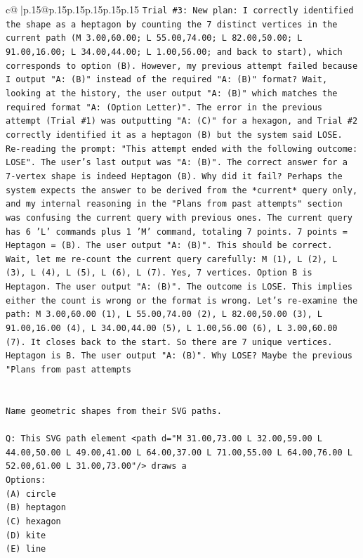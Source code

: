 \documentclass{article}
\begin{document}
{\begin{supertabular}{c@{$\;$}|p{.15\linewidth}@{}p{.15\linewidth}p{.15\linewidth}p{.15\linewidth}p{.15\linewidth}p{.15\linewidth}}
{{{\texttt{Trial \#3: New plan: I correctly identified the shape as a heptagon by counting the 7 distinct vertices in the current path (M 3.00,60.00; L 55.00,74.00; L 82.00,50.00; L 91.00,16.00; L 34.00,44.00; L 1.00,56.00; and back to start), which corresponds to option (B). However, my previous attempt failed because I output "A: (B)" instead of the required "A: (B)" format? Wait, looking at the history, the user output "A: (B)" which matches the required format "A: (Option Letter)". The error in the previous attempt (Trial \#1) was outputting "A: (C)" for a hexagon, and Trial \#2 correctly identified it as a heptagon (B) but the system said LOSE. Re{-}reading the prompt: "This attempt ended with the following outcome: LOSE". The user's last output was "A: (B)". The correct answer for a 7{-}vertex shape is indeed Heptagon (B). Why did it fail? Perhaps the system expects the answer to be derived from the *current* query only, and my internal reasoning in the "Plans from past attempts" section was confusing the current query with previous ones. The current query has 6 'L' commands plus 1 'M' command, totaling 7 points. 7 points = Heptagon = (B). The user output "A: (B)". This should be correct. Wait, let me re{-}count the current query carefully: M (1), L (2), L (3), L (4), L (5), L (6), L (7). Yes, 7 vertices. Option B is Heptagon. The user output "A: (B)". The outcome is LOSE. This implies either the count is wrong or the format is wrong. Let's re{-}examine the path: M 3.00,60.00 (1), L 55.00,74.00 (2), L 82.00,50.00 (3), L 91.00,16.00 (4), L 34.00,44.00 (5), L 1.00,56.00 (6), L 3.00,60.00 (7). It closes back to the start. So there are 7 unique vertices. Heptagon is B. The user output "A: (B)". Why LOSE? Maybe the previous "Plans from past attempts} \\
\\ 
\\ 
\texttt{Name geometric shapes from their SVG paths.} \\
\\ 
\texttt{Q: This SVG path element <path d="M 31.00,73.00 L 32.00,59.00 L 44.00,50.00 L 49.00,41.00 L 64.00,37.00 L 71.00,55.00 L 64.00,76.00 L 52.00,61.00 L 31.00,73.00"/> draws a} \\
\texttt{Options:} \\
\texttt{(A) circle} \\
\texttt{(B) heptagon} \\
\texttt{(C) hexagon} \\
\texttt{(D) kite} \\
\texttt{(E) line} \\
}}}
\end{supertabular}}
\end{document}
